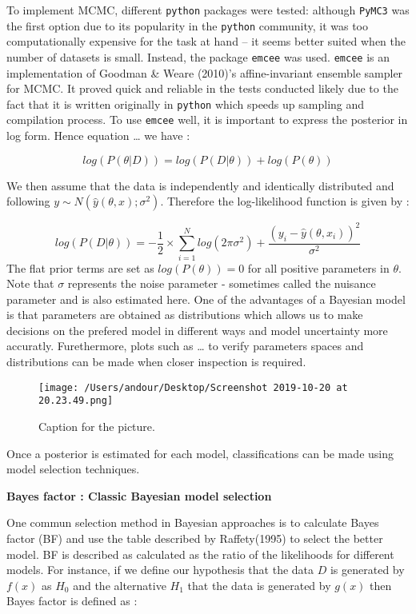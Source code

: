 \documentclass[]{article}
\begin{document}
To implement MCMC, different \texttt{python} packages were tested:
although \texttt{PyMC3} was the first option due to its popularity in
the \texttt{python} community, it was too computationally expensive for
the task at hand -- it seems better suited when the number of datasets
is small. Instead, the package \texttt{emcee} was used. \texttt{emcee}
is an implementation of Goodman \& Weare (2010)'s affine-invariant
ensemble sampler for MCMC. It proved quick and reliable in the tests
conducted likely due to the fact that it is written originally in
\texttt{python} which speeds up sampling and compilation process. To use
\texttt{emcee} well, it is important to express the posterior in log
form. Hence equation \ldots{} we have :

\[log(P(\theta|D)) = log(P(D|\theta)) + log(P(\theta)) \]

We then assume that the data is independently and identically
distributed and following \(y \sim N(\hat y(\theta,x);\sigma^2)\).
Therefore the log-likelihood function is given by :

\[ log(P(D|\theta)) = -\frac {1} {2} \times  \sum_{i=1}^N log(2\pi\sigma^2) + \frac {(y_i - \hat y(\theta,x_i))^2} {\sigma^2}\]
The flat prior terms are set as \(log(P(\theta)) = 0\) for all positive
parameters in \(\theta\). Note that \(\sigma\) represents the noise
parameter - sometimes called the nuisance parameter and is also
estimated here. One of the advantages of a Bayesian model is that
parameters are obtained as distributions which allows us to make
decisions on the prefered model in different ways and model uncertainty
more accuratly. Furethermore, plots such as \ldots{} to verify
parameters spaces and distributions can be made when closer inspection
is required.

\begin{figure}
\centering
\texttt{[image: /Users/andour/Desktop/Screenshot 2019-10-20 at 20.23.49.png]}
\caption{Caption for the picture.}
\end{figure}

Once a posterior is estimated for each model, classifications can be
made using model selection techniques.

\textbf{Bayes factor : Classic Bayesian model selection}

One commun selection method in Bayesian approaches is to calculate Bayes
factor (BF) and use the table described by Raffety(1995) to select the
better model. BF is described as calculated as the ratio of the
likelihoods for different models. For instance, if we define our
hypothesis that the data \(D\) is generated by \(f(x)\) as \(H_0\) and
the alternative \(H_1\) that the data is generated by \(g(x)\) then
Bayes factor is defined as :
\end{document}
